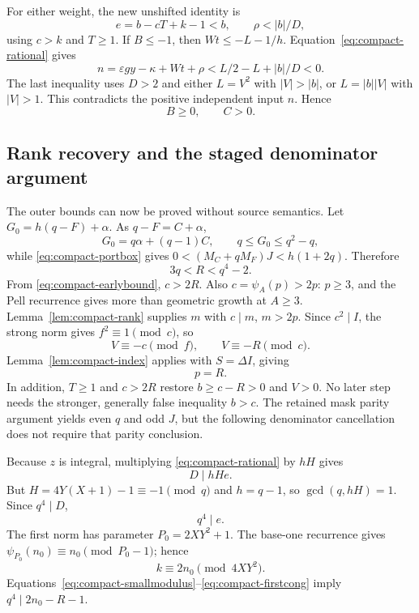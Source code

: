 For either weight, the new unshifted identity is
\[
 e=b-cT+k-1<b,\qquad \rho<|b|/D,
\]
using \(c>k\) and \(T\ge1\).  If \(B\le-1\), then
\(Wt\le-L-1/h\).  Equation~\eqref{eq:compact-rational} gives
\[
 n=\varepsilon gy-\kappa+Wt+\rho
     <L/2-L+|b|/D<0.
\]
The last inequality uses \(D>2\) and either \(L=V^2\) with
\(|V|>|b|\), or \(L=|b||V|\) with \(|V|>1\).
This contradicts the positive independent input \(n\).  Hence
\begin{equation}
 B\ge0,\qquad C>0.                               \label{eq:compact-transportpos}
\end{equation}

\subsection{Rank recovery and the staged denominator argument}
\label{subsec:compact-staged}

The outer bounds can now be proved without source semantics.  Let
\(G_0=h(q-F)+\alpha\).  As \(q-F=C+\alpha\),
\[
 G_0=q\alpha+(q-1)C,\qquad q\le G_0\le q^2-q,
\]
while \eqref{eq:compact-portbox} gives
\(0<(M_C+qM_F)J<h(1+2q)\).  Therefore
\begin{equation}
 3q<R<q^4-2.                                      \label{eq:compact-outerbound}
\end{equation}
From \eqref{eq:compact-earlybound}, \(c>2R\).  Also
\(c=\psi_A(p)>2p\): \(p\ge3\), and the Pell recurrence gives more
than geometric growth at \(A\ge3\).  Lemma~\ref{lem:compact-rank}
supplies \(m\) with \(c\mid m\), \(m>2p\).
Since \(c^2\mid I\), the strong norm gives \(f^2\equiv1\pmod c\), so
\[
 V\equiv-c\pmod f,\qquad V\equiv-R\pmod c.
\]
Lemma~\ref{lem:compact-index} applies with \(S=\Delta I\), giving
\begin{equation}
 p=R.                                             \label{eq:compact-rankexact}
\end{equation}
In addition, \(T\ge1\) and \(c>2R\) restore \(b\ge c-R>0\) and
\(V>0\).  No later step needs the stronger, generally false inequality
\(b>c\).  The retained mask parity argument yields even \(q\) and odd
\(J\), but the following denominator cancellation does not require that
parity conclusion.\cite{native61,certificate}

Because \(z\) is integral, multiplying
\eqref{eq:compact-rational} by \(hH\) gives
\begin{equation}
 D\mid hHe.                                      \label{eq:compact-partialdiv}
\end{equation}
But \(H=4Y(X+1)-1\equiv-1\pmod q\) and \(h=q-1\), so
\(\gcd(q,hH)=1\).  Since \(q^4\mid D\),
\begin{equation}
 q^4\mid e.                                      \label{eq:compact-smallmodulus}
\end{equation}
The first norm has parameter \(P_0=2XY^2+1\).
The base-one recurrence gives
\(\psi_{P_0}(n_0)\equiv n_0\pmod{P_0-1}\); hence
\begin{equation}
 k\equiv2n_0\pmod{4XY^2}.                        \label{eq:compact-firstcong}
\end{equation}
Equations~\eqref{eq:compact-smallmodulus}--\eqref{eq:compact-firstcong}
imply \(q^4\mid2n_0-R-1\).

